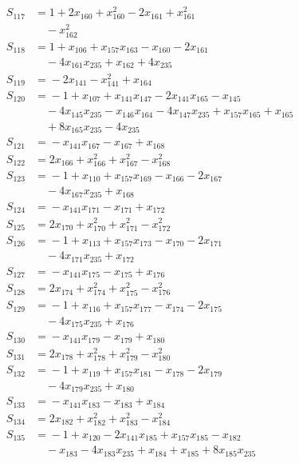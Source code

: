 \begin{align*}
S_{117} &={} 1 +2x_{160} +x_{160}^{2} -2x_{161} +x_{161}^{2} \\
&\quad{} -x_{162}^{2} \\
S_{118} &={} 1 +x_{106} +x_{157}x_{163} -x_{160} -2x_{161} \\
&\quad{} -4x_{161}x_{235} +x_{162} +4x_{235} \\
S_{119} &={} -2x_{141} -x_{141}^{2} +x_{164} \\
S_{120} &={} -1 +x_{107} +x_{141}x_{147} -2x_{141}x_{165} -x_{145} \\
&\quad{} -4x_{145}x_{235} -x_{146}x_{164} -4x_{147}x_{235} +x_{157}x_{165} +x_{165} \\
&\quad{} +8x_{165}x_{235} -4x_{235} \\
S_{121} &={} -x_{141}x_{167} -x_{167} +x_{168} \\
S_{122} &={} 2x_{166} +x_{166}^{2} +x_{167}^{2} -x_{168}^{2} \\
S_{123} &={} -1 +x_{110} +x_{157}x_{169} -x_{166} -2x_{167} \\
&\quad{} -4x_{167}x_{235} +x_{168} \\
S_{124} &={} -x_{141}x_{171} -x_{171} +x_{172} \\
S_{125} &={} 2x_{170} +x_{170}^{2} +x_{171}^{2} -x_{172}^{2} \\
S_{126} &={} -1 +x_{113} +x_{157}x_{173} -x_{170} -2x_{171} \\
&\quad{} -4x_{171}x_{235} +x_{172} \\
S_{127} &={} -x_{141}x_{175} -x_{175} +x_{176} \\
S_{128} &={} 2x_{174} +x_{174}^{2} +x_{175}^{2} -x_{176}^{2} \\
S_{129} &={} -1 +x_{116} +x_{157}x_{177} -x_{174} -2x_{175} \\
&\quad{} -4x_{175}x_{235} +x_{176} \\
S_{130} &={} -x_{141}x_{179} -x_{179} +x_{180} \\
S_{131} &={} 2x_{178} +x_{178}^{2} +x_{179}^{2} -x_{180}^{2} \\
S_{132} &={} -1 +x_{119} +x_{157}x_{181} -x_{178} -2x_{179} \\
&\quad{} -4x_{179}x_{235} +x_{180} \\
S_{133} &={} -x_{141}x_{183} -x_{183} +x_{184} \\
S_{134} &={} 2x_{182} +x_{182}^{2} +x_{183}^{2} -x_{184}^{2} \\
S_{135} &={} -1 +x_{120} -2x_{141}x_{185} +x_{157}x_{185} -x_{182} \\
&\quad{} -x_{183} -4x_{183}x_{235} +x_{184} +x_{185} +8x_{185}x_{235} \\

\end{align*}
